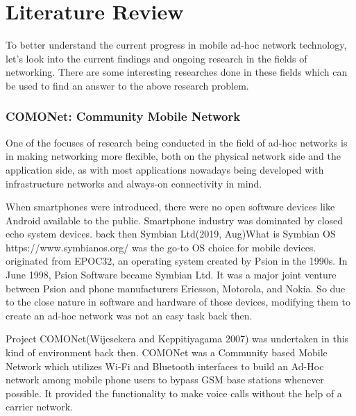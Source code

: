 \chapter[Literature Review]{Literature Review}
\vspace{12pt}

To better understand the current progress in mobile ad-hoc network technology, let's look into the current findings and ongoing research in the fields of networking. There are some interesting researches done in these fields which can be used to find an answer to the above research problem.

\vspace{12pt}

\subsection{COMONet: Community Mobile Network}

\vspace{12pt}

One of the focuses of research being conducted in the field of ad-hoc networks is in making networking more flexible, both on the physical network side and the application side, as with most applications nowadays being developed with infrastructure networks and always-on connectivity in mind.
\vspace{12pt}

When smartphones were introduced, there were no open software devices like Android available to the public. Smartphone industry was dominated by closed echo system devices. back then Symbian Ltd(2019, Aug)What is Symbian OS https://www.symbianos.org/ \cite{SymbianOS} was the go-to OS choice for mobile devices. originated from EPOC32, an operating system created by Psion in the 1990s. In June 1998, Psion Software became Symbian Ltd. It was a major joint venture between Psion and phone manufacturers  Ericsson, Motorola, and Nokia. So due to the close nature in software and hardware of those devices, modifying them to create an ad-hoc network was not an easy task back then.

\vspace{12pt}
Project COMONet(Wijesekera and Keppitiyagama 2007)\cite{comonet} was undertaken in this kind of environment back then. COMONet was a  Community based  Mobile Network which utilizes Wi-Fi and Bluetooth interfaces to build an Ad-Hoc network among mobile phone users to bypass GSM base stations whenever possible. It provided the functionality to make voice calls without the help of a carrier network.

